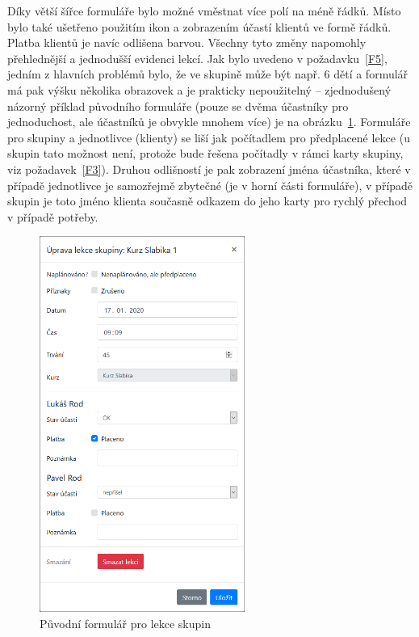 Díky větší šířce formuláře bylo možné vměstnat více polí na méně řádků. Místo bylo také ušetřeno použitím ikon a zobrazením účastí klientů ve formě řádků. Platba klientů je navíc odlišena barvou. Všechny tyto změny napomohly přehlednější a jednodušší evidenci lekcí. Jak bylo uvedeno v požadavku~\ref{F5}, jedním z hlavních problémů bylo, že ve skupině může být např. 6 dětí a formulář má pak výšku několika obrazovek a je prakticky nepoužitelný -- zjednodušený názorný příklad původního formuláře (pouze se dvěma účastníky pro jednoduchost, ale účastníků je obvykle mnohem více) je na obrázku~\ref{fig:ui-screen-lekce-skupina}. Formuláře pro skupiny a jednotlivce (klienty) se liší jak počítadlem pro předplacené lekce (u skupin tato možnost není, protože bude řešena počítadly v rámci karty skupiny, viz požadavek~\ref{F3}). Druhou odlišností je pak zobrazení jména účastníka, které v případě jednotlivce je samozřejmě zbytečné (je v horní části formuláře), v případě skupin je toto jméno klienta současně odkazem do jeho karty pro rychlý přechod v případě potřeby.

\begin{figure}\centering
    \includegraphics[width=0.6\textwidth]{img/ui-screen-lekce-skupina.png}
    \caption{Původní formulář pro lekce skupin}\label{fig:ui-screen-lekce-skupina}
\end{figure}

